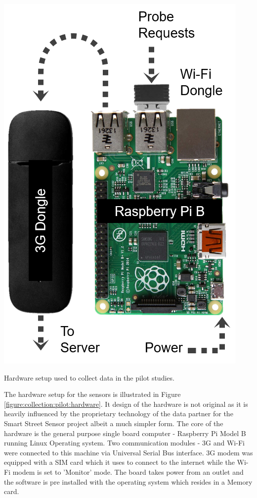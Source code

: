 \begin{marginfigure}[2cm]
  \includegraphics{images/pilot-hardware.png}
  \caption{Hardware setup used to collect data in the pilot studies.}
  \label{figure:collection:pilot:hardware}
\end{marginfigure}

The hardware setup for the sensors is illustrated in Figure \ref{figure:collection:pilot:hardware}.
It design of the hardware is not original as it is heavily influenced by the proprietary technology of the data partner for the Smart Street Sensor project albeit a much simpler form. 
The core of the hardware is the general purpose single board computer - Raspberry Pi Model B running Linux Operating system.
Two communication modules - 3G and Wi-Fi were connected to this machine via Universal Serial Bus interface.
3G modem was equipped with a SIM card which it uses to connect to the internet while the Wi-Fi modem is set to 'Monitor' mode.
The board takes power from an outlet and the software is pre installed with the operating system which resides in a Memory card.

